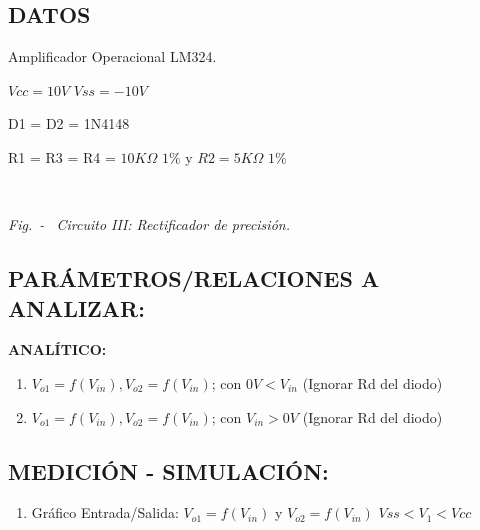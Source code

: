 \subsection{DATOS}
Amplificador Operacional LM324.

$Vcc = 10V$  $Vss = -10V$

D1 = D2 = 1N4148

R1 = R3 = R4 = $10K\Omega$ $1\%$ y $R2 = 5K\Omega$ $1\%$

\begin{center}
	 \\
	\begin{center}
    	\begin{small}
        \textit{Fig.\thefigure \ - \ 	Circuito III: Rectificador de precisión.}
		\end{small}
    \end{center}
\end{center}

\subsection{PARÁMETROS/RELACIONES A ANALIZAR:}

\noindent \textbf{ANALÍTICO:}
\begin{enumerate}[3.1]
    \item $V_{o1} = f(V_{in}), V_{o2} = f(V_{in})$; con $0V < V_{in}$ (Ignorar Rd del diodo)
    \item $V_{o1} = f(V_{in}), V_{o2} = f(V_{in})$; con $V_{in} > 0V$ (Ignorar Rd del diodo)\end{enumerate}

\subsection{MEDICIÓN - SIMULACIÓN:}
\begin{enumerate}[3.3]
    \item Gráfico Entrada/Salida: $V_{o1}=f(V_{in})$\hspace{0.25cm} y \hspace{0.25cm} $V_{o2} = f(V_{in})$ \hspace{0.25cm}$Vss < V_{1} < Vcc$
\end{enumerate}
